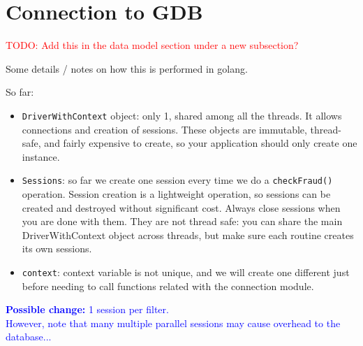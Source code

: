 \documentclass{article}
\begin{document}
\section{Connection to GDB}

\textcolor{red}{TODO: Add this in the data model section under a new subsection?}

Some details / notes on how this is performed in golang.


So far:
\begin{itemize}
  \item \texttt{DriverWithContext} object: only 1, shared among all the threads. It allows connections and creation of sessions. These objects are immutable, thread-safe, and fairly expensive to create, so your application should only create one instance.
  \item \texttt{Sessions}: so far we create one session every time we do a \texttt{checkFraud()} operation.
  Session creation is a lightweight operation, so sessions can be created and destroyed without significant cost. Always close sessions when you are done with them. They are not thread safe: you can share the main DriverWithContext object
  across threads, but make sure each routine creates its own sessions.
  \item \texttt{context}: context variable is not unique, and we will create one different just before needing to call functions related with the connection module.
\end{itemize}


\textcolor{blue}{\textbf{Possible change:} 1 session per filter.\\
However, note that many multiple parallel sessions may cause overhead to the database...}




\end{document}
